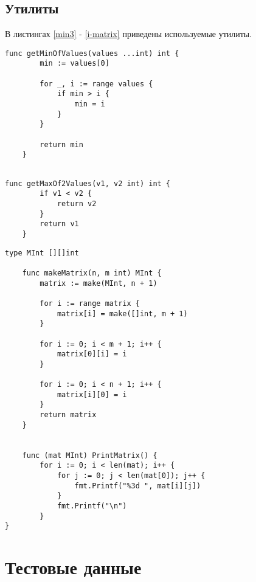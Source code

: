 \subsection{Утилиты}
В листингах \ref{min3} - \ref{i-matrix} приведены используемые утилиты.
\begin{lstlisting}[label=min3,caption=Функция нахождения минимума из N целых чисел]
	func getMinOfValues(values ...int) int {
		min := values[0]
		
		for _, i := range values {
			if min > i {
				min = i
			}
		}
		
		return min
	}
	
\end{lstlisting}

\begin{lstlisting}[label=max2,caption=Функция нахождения максимума из двух целых чисел]
	func getMaxOf2Values(v1, v2 int) int {
		if v1 < v2 {
			return v2
		}
		return v1
	}
\end{lstlisting}


\begin{lstlisting}[label=i-matrix,caption=Определение типа целочисленной матрицы; его инициализация и вывод]
	type MInt [][]int
	
	func makeMatrix(n, m int) MInt {
		matrix := make(MInt, n + 1)
		
		for i := range matrix {
			matrix[i] = make([]int, m + 1)
		}
		
		for i := 0; i < m + 1; i++ {
			matrix[0][i] = i
		}
		
		for i := 0; i < n + 1; i++ {
			matrix[i][0] = i
		}
		return matrix
	}
	

	func (mat MInt) PrintMatrix() {
		for i := 0; i < len(mat); i++ {
			for j := 0; j < len(mat[0]); j++ {
				fmt.Printf("%3d ", mat[i][j])
			}
			fmt.Printf("\n")
		}
}

\end{lstlisting}

\section{Тестовые данные}

